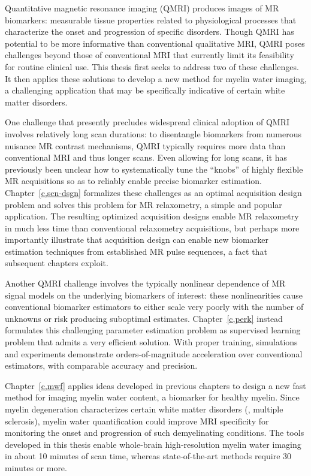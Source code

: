 \setlength{\parindent}{0ex}
Quantitative magnetic resonance imaging (QMRI)
produces images of MR biomarkers: 
measurable tissue properties
related to physiological processes
that characterize the onset and progression
of specific disorders.
Though QMRI has potential 
to be more informative 
than conventional qualitative MRI,
QMRI poses challenges 
beyond those of conventional MRI
that currently limit its feasibility 
for routine clinical use.
This thesis first seeks to address 
two of these challenges.
It then applies these solutions
to develop a new method
for myelin water imaging,
a challenging application 
that may be specifically indicative
of certain white matter disorders. 

\setlength{\parindent}{4ex}
One challenge 
that presently precludes widespread clinical adoption of QMRI
involves relatively long scan durations:
to disentangle biomarkers
from numerous nuisance MR contrast mechanisms,
QMRI typically requires more data than conventional MRI
and thus longer scans. 
Even allowing for long scans,
it has previously been unclear 
how to systematically tune the ``knobs'' 
of highly flexible MR acquisitions
so as to reliably enable precise biomarker estimation.
Chapter~\ref{c,scn-dsgn} formalizes these challenges
as an optimal acquisition design problem
and solves this problem for MR relaxometry,
a simple and popular application.
The resulting optimized acquisition designs
enable MR relaxometry
in much less time 
than conventional relaxometry acquisitions, 
but perhaps more importantly illustrate
that acquisition design can enable 
new biomarker estimation techniques
from established MR pulse sequences,
a fact that subsequent chapters exploit.

Another QMRI challenge
involves the typically nonlinear dependence 
of MR signal models
on the underlying biomarkers of interest:
these nonlinearities 
cause conventional biomarker estimators
to either scale very poorly 
with the number of unknowns
or risk producing suboptimal estimates.
Chapter~\ref{c,perk} instead formulates
this challenging parameter estimation problem
as supervised learning problem
that admits a very efficient solution.
With proper training,
simulations and experiments 
demonstrate orders-of-magnitude acceleration
over conventional estimators,
with comparable accuracy and precision.

Chapter~\ref{c,mwf} applies ideas 
developed in previous chapters
to design a new fast method
for imaging myelin water content,
a biomarker for healthy myelin.
Since myelin degeneration characterizes
certain white matter disorders
(\ie, multiple sclerosis),
myelin water quantification
could improve MRI specificity
for monitoring the onset and progression
of such demyelinating conditions.
The tools developed in this thesis enable 
whole-brain high-resolution myelin water imaging 
in about 10 minutes of scan time,
whereas state-of-the-art methods
require 30 minutes or more.
